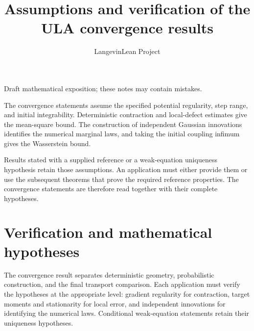\documentclass[11pt,a4paper]{article}
\title{\texorpdfstring{Assumptions and verification of the ULA convergence results}{Assumptions and verification of the ULA convergence results}}
\author{LangevinLean Project}
\date{}
\begin{document}
\maketitle
Draft mathematical exposition; these notes may contain mistakes.


The convergence statements assume the specified potential regularity, step range, and initial integrability. Deterministic contraction and local-defect estimates give the mean-square bound. The construction of independent Gaussian innovations identifies the numerical marginal laws, and taking the initial coupling infimum gives the Wasserstein bound.



Results stated with a supplied reference or a weak-equation uniqueness hypothesis retain those assumptions. An application must either provide them or use the subsequent theorems that prove the required reference properties. The convergence statements are therefore read together with their complete hypotheses.


\section{\texorpdfstring{Verification and mathematical hypotheses}{Verification and mathematical hypotheses}}


The convergence result separates deterministic geometry, probabilistic construction, and the final transport comparison. Each application must verify the hypotheses at the appropriate level: gradient regularity for contraction, target moments and stationarity for local error, and independent innovations for identifying the numerical laws. Conditional weak-equation statements retain their uniqueness hypotheses.
\end{document}
